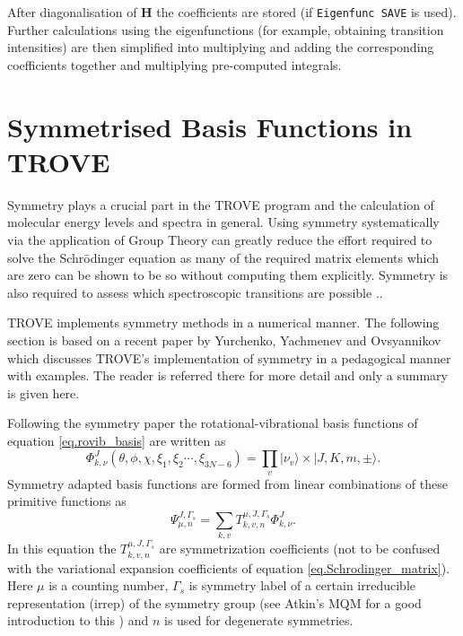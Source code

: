 After diagonalisation of $\mathbf{H}$ the coefficients are stored (if \verb|Eigenfunc SAVE| is used). Further calculations
using the eigenfunctions (for example, obtaining transition intensities) are then simplified into multiplying and adding
the corresponding coefficients together and multiplying pre-computed integrals. 




\section{Symmetrised Basis Functions in TROVE}

Symmetry plays a crucial part in the TROVE program and the calculation of molecular energy levels and spectra in general. 
Using symmetry systematically via the application of Group Theory \cite{11Atkins.book} can greatly reduce the effort required
to solve the Schr\={o}dinger equation as many of the required matrix elements which are zero can be shown to be so without
computing them explicitly. Symmetry is also required to assess which spectroscopic transitions are possible \cite{98BuJexx}..

TROVE implements symmetry methods in a numerical manner. The following section is based on a recent paper by 
Yurchenko, Yachmenev and Ovsyannikov \cite{17YuYaOv.methods} 
which discusses TROVE's implementation of symmetry in a pedagogical manner
with examples. The reader is referred there for more detail and only a summary is given here. 

Following the symmetry paper the rotational-vibrational basis functions of equation \ref{eq.rovib_basis} are written as
\begin{equation}
\label{eq.rovib_basis2}
\Phi_{k,\nu}^J(\theta,\phi,\chi,\xi_1,\xi_2\cdots, \xi_{3N-6}) = \prod_{v} |\nu_v \rangle \times |J,K,m,\pm \rangle.
\end{equation}
Symmetry adapted basis functions are formed from linear combinations of these primitive functions as
\begin{equation}
\label{eq.sym_adapted_basis}
\Psi_{\mu,n}^{J,\Gamma_s} = \sum_{k,v} T_{k,v,n}^{\mu,J,\Gamma_s} \Phi_{k,\nu}^J.
\end{equation}
In this equation the $T_{k,v,n}^{\mu,J,\Gamma_s}$ are symmetrization coefficients (not to be confused with the
variational expansion coefficients of equation \ref{eq.Schrodinger_matrix}). Here $\mu$ is a counting number,
$\Gamma_s$ is symmetry label of a certain irreducible representation (irrep) of the symmetry group (see Atkin's MQM for 
a good introduction to this \cite{11Atkins.book}) and $n$ is used for degenerate symmetries.

